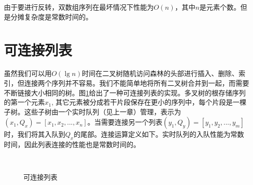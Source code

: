 \documentclass[b5paper]{ctexart}
\begin{document}
由于要进行反转，双数组序列在最坏情况下性能为$O(n)$，其中$n$是元素个数。但是分摊复杂度是常数时间的。

\begin{Exercise}
\end{Exercise}

\section{可连接列表}

虽然我们可以用$O(\lg n)$时间在二叉树随机访问森林的头部进行插入、删除、索引，但连接两个序列并不容易。我们不能简单地将所有二叉树合并到一起，而需要不断链接大小相同的树。图\ref{fig:clist}给出了一种可连接列表的实现。多叉树的根存储序列的第一个元素$x_1$, 其它元素被分成若干片段保存在更小的序列中，每个片段是一棵子树。这些子树由一个实时队列（见上一章）管理，表示为$(x_1, Q_x) = [x_1, x_2, ..., x_n]$。当需要连接另一个列表$(y_1, Q_y) = [y_1, y_2, ..., y_m]$时，我们将其入队到$Q_x$的尾部。连接运算定义如下。实时队列的入队性能为常数时间，因此列表连接的性能也是常数时间的。

\begin{figure}[htbp]
  \centering
   \\
  \caption{可连接列表}
  \label{fig:clist}
\end{figure}
\end{document}
